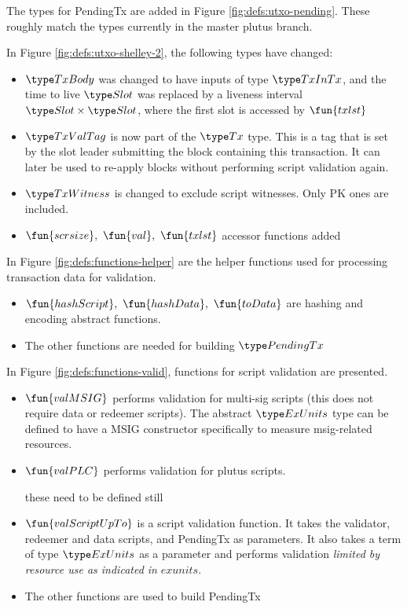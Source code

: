 The types for PendingTx are added in Figure \ref{fig:defs:utxo-pending}.
These roughly match the types currently in the master plutus branch.

In Figure \ref{fig:defs:utxo-shelley-2}, the following types have changed:

\begin{itemize}
  \item $\TxBody$ was changed to have inputs of type $\TxInTx$, and the
  time to live $\Slot$ was replaced by a liveness interval $\Slot \times \Slot$,
  where the first slot is accessed by $\fun{txlst}$
  \item $\TxValTag$ is now part of the $\Tx$ type. This is a tag that is
  set by the slot leader submitting the block containing this transaction.
  It can later be used to re-apply blocks without performing script validation
  again.
  \item $\TxWitness$ is changed to exclude script witnesses. Only PK ones
  are included.
  \item $\fun{scrsize},~\fun{val},~\fun{txlst}$ accessor functions added
\end{itemize}

In Figure \ref{fig:defs:functions-helper} are the helper functions used for
processing transaction data for validation.

\begin{itemize}
  \item $\fun{hashScript},~ \fun{hashData},~\fun{toData}$ are hashing and encoding
  abstract functions.
  \item The other functions are needed for building $\PendingTx$
\end{itemize}

In Figure \ref{fig:defs:functions-valid}, functions for script validation
are presented.

\begin{itemize}
  \item $\fun{valMSIG}$ performs validation for multi-sig scripts
  (this does not require data or redeemer scripts). The abstract $\ExUnits$
  type can be defined to have a MSIG constructor specifically to
  measure msig-related resources.
  \item $\fun{valPLC}$ performs validation for plutus scripts.
  \begin{note}
    these need to be defined still
  \end{note}
\item $\fun{valScriptUpTo}$ is a script validation function. It takes the
validator, redeemer and data scripts, and PendingTx as parameters. It also
takes a term of type $\ExUnits$ as a parameter and performs validation
\textit{limited by resource use as indicated in} $exunits$.
\item The other functions are used to build PendingTx
\end{itemize}

